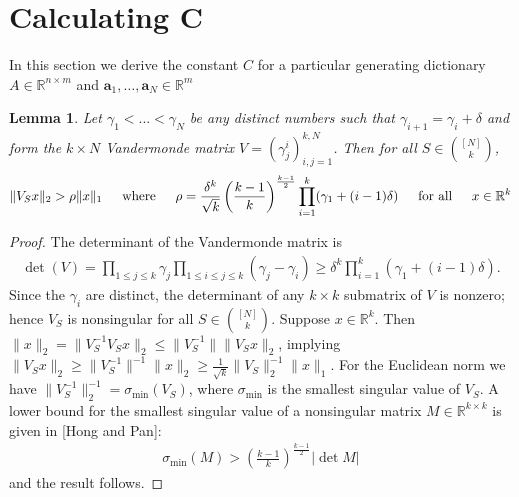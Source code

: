 \documentclass[journal, onecolumn]{IEEEtran}
\newtheorem{lemma}{Lemma}
\begin{document}

\section{Calculating C}

In this section we derive the constant $C$ for a particular generating dictionary $A \in \mathbb{R}^{n \times m}$ and $\mathbf{a}_1, \ldots, \mathbf{a}_N \in \mathbb{R}^m$


\begin{lemma}\label{MatrixLowerBoundLemma}
Let $\gamma_1 < ... < \gamma_N$ be any distinct numbers such that $\gamma_{i+1} = \gamma_i + \delta$ and form the $k \times N$ Vandermonde matrix $V = (\gamma^i_j)^{k,N}_{i,j=1}$. Then for all $S \in {[N] \choose k}$, 
\begin{align}
	\|V_S x\|_2 > \rho \|x\|_1 \indent \text{where} \indent \rho = \frac{\delta^k}{\sqrt{k}} \left( \frac{k-1}{k} \right)^\frac{k-1}{2} \prod_{i = 1}^k (\gamma_1 + (i-1)\delta) \indent \text{for all} \indent x \in \mathbb{R}^k
\end{align}
\end{lemma}

\begin{proof} 
The determinant of the Vandermonde matrix is
\begin{align}
	\det(V) = \prod_{1 \leq j \leq k} \gamma_j \prod_{1 \leq i \leq j \leq k} (\gamma_j - \gamma_i) \geq \delta^k \prod_{i = 1}^k (\gamma_1 + (i-1)\delta).
\end{align}	
Since the $\gamma_i$ are distinct, the determinant of any $k \times k$ submatrix of $V$ is nonzero; hence $V_S$ is nonsingular for all $S \in {[N] \choose k}$. Suppose $x \in \mathbb{R}^k$. Then $\|x\|_2 = \|V_S^{-1} V_S x\|_2 \leq \|V_S^{-1}\| \|V_S x\|_2$, implying $\|V_Sx\|_2 \geq \|V_S^{-1}\|^{-1}\|x\|_2 \geq \frac{1}{\sqrt{k}} \|V_S\|_2^{-1}\|x\|_1$. For the Euclidean norm we have $\|V_S^{-1}\|_2^{-1} = \sigma_{\min}(V_S)$, where $\sigma_{\min}$ is the smallest singular value of $V_S$. A lower bound for the smallest singular value of a nonsingular matrix $M \in \mathbb{R}^{k \times k}$ is given in [Hong and Pan]:
\begin{align}
	\sigma_{\min}(M) > \left( \frac{k-1}{k} \right)^\frac{k-1}{2} |\det M|
\end{align}
%
and the result follows. 
\end{proof}
\end{document}
